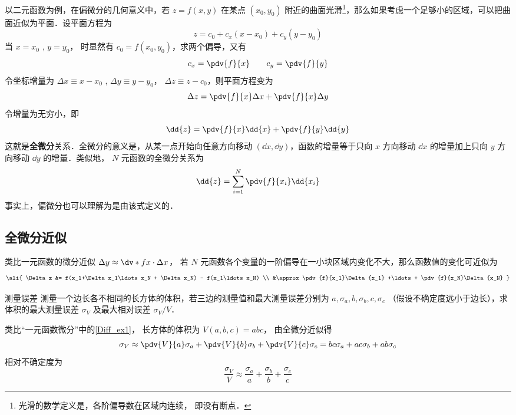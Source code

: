 

以二元函数为例，在偏微分的几何意义中，若 $z = f(x,y)$ 在某点 $({x_0},{y_0})$ 附近的曲面光滑\footnote{光滑的数学定义是，各阶偏导数在区域内连续， 即没有断点．}，那么如果考虑一个足够小的区域，可以把曲面近似为平面．设平面方程为
\begin{equation}
z = {c_0} + {c_x}(x - {x_0}) + {c_y}(y - {y_0})
\end{equation}
当 $x=x_0$ , $y=y_0$， 时显然有 ${c_0} = f({x_0},{y_0})$，求两个偏导，又有
\begin{equation}
{c_x} = \pdv{f}{x} \qquad {c_y} = \pdv{f}{y}
\end{equation}
令坐标增量为 $\Delta x \equiv x - {x_0}$ , $\Delta y \equiv y - {y_0}$，  $\Delta z \equiv z - {c_0}$，则平面方程变为
\begin{equation}
\Delta z = \pdv{f}{x}\Delta x + \pdv{f}{x}\Delta y
\end{equation}
令增量为无穷小，即
 \begin{equation}
\dd{z} = \pdv{f}{x} \dd{x} + \pdv{f}{y} \dd{y}
\end{equation}
这就是\textbf{全微分}关系．全微分的意义是，从某一点开始向任意方向移动 $(\dd{x}, \dd{y})$，函数的增量等于只向 $x$ 方向移动 $\dd{x}$ 的增量加上只向 $y$ 方向移动 $\dd{y}$ 的增量．类似地， $N$ 元函数的全微分关系为
\begin{equation}
\dd{z} = \sum_{i = 1}^{N}\pdv{f}{x_i} \dd{x_i}
\end{equation}
事实上，偏微分也可以理解为是由该式定义的．

\subsection{全微分近似}
类比一元函数的微分近似 $\Delta y \approx \dv*{f}{x}\cdot \Delta x$， 若 $N$ 元函数各个变量的一阶偏导在一小块区域内变化不大，那么函数值的变化可近似为
\begin{equation}\label{TDiff_eq6}\ali{
\Delta z &= f(x_1+\Delta x_1\ldots x_N + \Delta x_N) - f(x_1\ldots x_N) \\
&\approx \pdv{f}{x_1}\Delta {x_1} +\ldots + \pdv{f}{x_N}\Delta {x_N}
}\end{equation}

\begin{exam}{测量误差}
测量一个边长各不相同的长方体的体积，若三边的测量值和最大测量误差分别为 $a, \sigma_a, b, \sigma_b, c, \sigma_c$ （假设不确定度远小于边长），求体积的最大测量误差 $\sigma_V$ 及最大相对误差 $\sigma_V/V$．

类比“一元函数微分”中的\autoref{Diff_ex1}， 长方体的体积为 $V(a,b,c) = abc$， 由全微分近似得
\begin{equation}
{\sigma _V} \approx \pdv{V}{a} \sigma _a + \pdv{V}{b} \sigma _b + \pdv{V}{c} \sigma _c = bc{\sigma _a} + ac{\sigma _b} + ab{\sigma _c}
\end{equation}
相对不确定度为
\begin{equation}
\frac{\sigma _V}{V} \approx \frac{\sigma _a}{a} + \frac{\sigma _b}{b} + \frac{\sigma _c}{c}
\end{equation}

\end{exam}